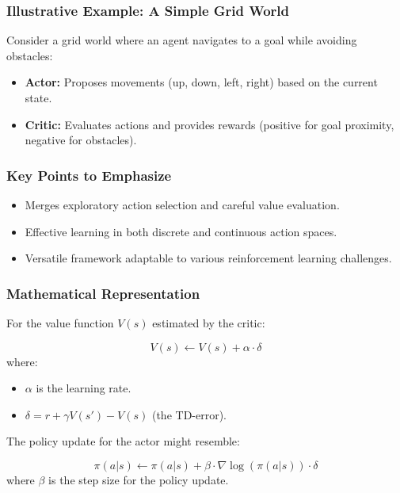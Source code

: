 \documentclass{beamer}
\begin{document}
\begin{frame}[fragile]
    \frametitle{Illustrative Example: A Simple Grid World}
    
    Consider a grid world where an agent navigates to a goal while avoiding obstacles:
    
    \begin{itemize}
        \item \textbf{Actor:} 
        Proposes movements (up, down, left, right) based on the current state.
        
        \item \textbf{Critic:} 
        Evaluates actions and provides rewards (positive for goal proximity, negative for obstacles).
    \end{itemize}
\end{frame}

\begin{frame}[fragile]
    \frametitle{Key Points to Emphasize}
    
    \begin{itemize}
        \item Merges exploratory action selection and careful value evaluation.
        \item Effective learning in both discrete and continuous action spaces.
        \item Versatile framework adaptable to various reinforcement learning challenges.
    \end{itemize}
\end{frame}

\begin{frame}[fragile]
    \frametitle{Mathematical Representation}
    
    For the value function \( V(s) \) estimated by the critic:
    
    \begin{equation}
    V(s) \gets V(s) + \alpha \cdot \delta
    \end{equation}
    where:
    \begin{itemize}
        \item \( \alpha \) is the learning rate.
        \item \( \delta = r + \gamma V(s') - V(s) \) (the TD-error).
    \end{itemize}

    The policy update for the actor might resemble:
    
    \begin{equation}
    \pi(a|s) \gets \pi(a|s) + \beta \cdot \nabla \log(\pi(a|s)) \cdot \delta
    \end{equation}
    where \( \beta \) is the step size for the policy update.
\end{frame}
\end{document}
